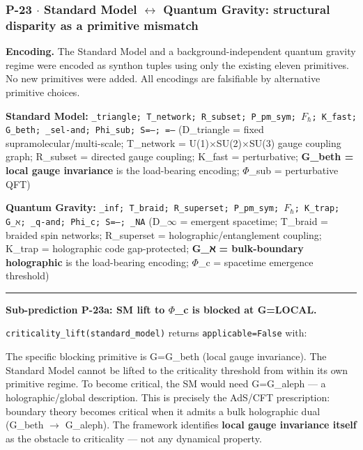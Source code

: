 \documentclass[12pt,a4paper]{article}
\begin{document}
\subsubsection{P-23 $\cdot$ Standard Model $\leftrightarrow$ Quantum Gravity: structural disparity as a primitive mismatch}

\textbf{Encoding.} The Standard Model and a background-independent quantum gravity regime were encoded as synthon tuples using only the existing eleven primitives. No new primitives were added. All encodings are falsifiable by alternative primitive choices.

\textbf{Standard Model:}
\texttt{\langleD\_triangle; T\_network; R\_subset; P\_pm\_sym; $F_{\hbar}$; K\_fast; G\_beth; \Gamma\_sel-and; Phi\_sub; S=---; \Omega=---\rangle}
(D\_triangle = fixed supramolecular/multi-scale; T\_network = U(1)$\times$SU(2)$\times$SU(3) gauge coupling graph; R\_subset = directed gauge coupling; K\_fast = perturbative; \textbf{G\_beth = local gauge invariance} is the load-bearing encoding; $\Phi$\_sub = perturbative QFT)

\textbf{Quantum Gravity:}
\texttt{\langleD\_inf; T\_braid; R\_superset; P\_pm\_sym; $F_{\hbar}$; K\_trap; G\_ℵ; \Gamma\_q-and; Phi\_c; S=---; \Omega\_NA\rangle}
(D\_$\infty$ = emergent spacetime; T\_braid = braided spin networks; R\_superset = holographic/entanglement coupling; K\_trap = holographic code gap-protected; \textbf{G\_ℵ = bulk-boundary holographic} is the load-bearing encoding; $\Phi$\_c = spacetime emergence threshold)

\begin{center}
\rule{0.5\textwidth}{0.4pt}
\end{center}

\textbf{Sub-prediction P-23a: SM lift to $\Phi$\_c is blocked at G=LOCAL.}

\texttt{criticality\_lift(standard\_model)} returns \texttt{applicable=False} with:

\begin{quote}
\end{quote}

The specific blocking primitive is G=G\_beth (local gauge invariance). The Standard Model cannot be lifted to the criticality threshold from within its own primitive regime. To become critical, the SM would need G=G\_aleph --- a holographic/global description. This is precisely the AdS/CFT prescription: boundary theory becomes critical when it admits a bulk holographic dual (G\_beth $\rightarrow$ G\_aleph). The framework identifies \textbf{local gauge invariance itself} as the obstacle to criticality --- not any dynamical property.
\end{document}
